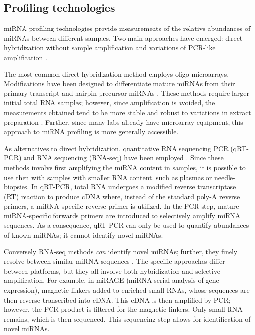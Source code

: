 \documentclass[12pt,english]{article}\usepackage{graphicx, color}
\numberwithin{equation}{section}
\numberwithin{figure}{section}
\theoremstyle{plain}
\theoremstyle{remark}
\begin{document}
\subsection{Profiling technologies}
\label{sec:profiling_tech}

miRNA profiling technologies provide measurements of the relative
abundances of miRNAs between different samples.
Two main approaches have emerged: direct hybridization without sample
amplification and variations of PCR-like amplification
\cite{kong2009strategies}.

The most common direct hybridization method employs oligo-microarrays.
Modifications have been designed to differentiate mature miRNAs from
their primary transcript and hairpin precursor miRNAs
\cite{liu2008expression}. These methods require larger initial total
RNA samples; however, since amplification is avoided, the measurements
obtained tend to be more stable and robust to variations in extract
preparation \cite{kong2009strategies}. Further, since many labs
already have microarray equipment, this approach to miRNA profiling is
more generally accessible.

As alternatives to direct hybridization, quantitative RNA sequencing
PCR (qRT-PCR) and RNA sequencing (RNA-seq) have been employed
\cite{kong2009strategies, pritchard2012microrna}. Since these methods
involve first amplifying the miRNA content in samples, it is possible
to use then with samples with smaller RNA content, such as plasmas or
needle-biopsies. In qRT-PCR, total RNA undergoes a modified reverse
transcriptase (RT) reaction to produce cDNA where, instead of the
standard poly-A reverse primers, a miRNA-specific reverse primer is
utilized. In the PCR step, mature miRNA-specific forwards primers are
introduced to selectively amplify miRNA sequences. As a consequence,
qRT-PCR can only be used to quantify abundances of known miRNAs; it
cannot identify novel miRNAs.

Conversely RNA-seq methods \emph{can} identify novel miRNAs; further,
they finely resolve between similar miRNA sequences
\cite{pritchard2012microrna}. The specific approaches differ between
platforms, but they all involve both hybridization and selective
amplification. For example, in miRAGE (miRNA serial analysis of gene
expression), magnetic linkers added to enriched small RNAs, whose
sequences are then reverse transcribed into cDNA. This cDNA is then
amplified by PCR; however, the PCR product is filtered for the
magnetic linkers. Only small RNA remains, which is then sequenced.
This sequencing step allows for identification of novel miRNAs.
\end{document}
